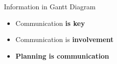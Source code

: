 \begin{frame}{Information in Gantt Diagram}    
    \begin{itemize}
        \item Communication \textbf{is key}
        \item Communication is \textbf{involvement}
        \item \textbf{Planning is communication}
    \end{itemize}
    
\end{frame}



    
